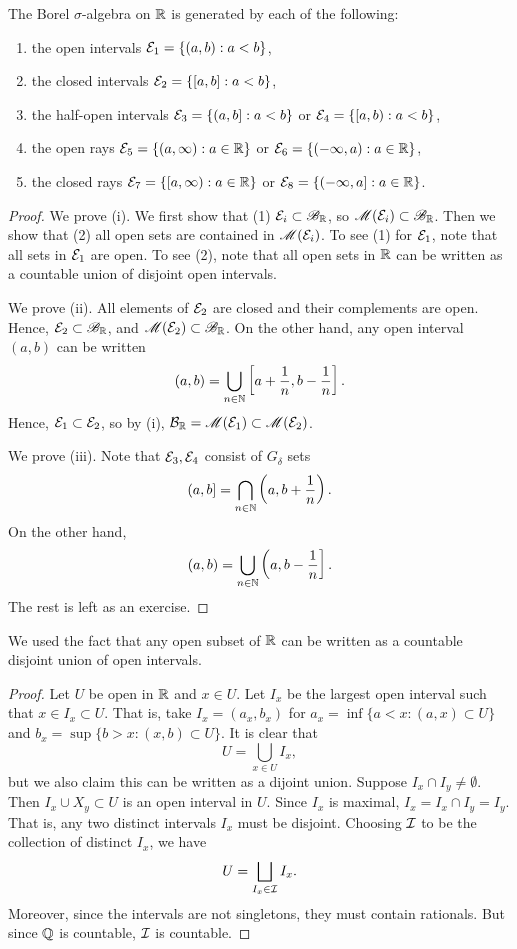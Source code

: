 \documentclass[12pt]{article} %
\begin{document}
\begin{proposition}
    The Borel $\sigma$-algebra on $\mathbb{R}$ is generated by each of the following:\begin{enumerate}
        \item the open intervals $\mathcal{E}_1 = \{(a, b) : a < b\}$,
        \item the closed intervals $\mathcal{E}_2 = \{[a, b] : a < b\}$,
        \item the half-open intervals $\mathcal{E}_3 = \{(a, b] : a < b\}$ or $\mathcal{E}_4 = \{[a, b) : a < b\}$,
        \item the open rays $\mathcal{E}_5 = \{(a, \infty) : a \in \mathbb{R} \}$ or $\mathcal{E}_6 = \{(-\infty, a) : a \in \mathbb{R} \}$,
        \item the closed rays $\mathcal{E}_7 = \{[a, \infty) : a \in \mathbb{R}\}$ or $\mathcal{E}_8 = \{(-\infty, a] : a \in \mathbb{R}\}$.
    \end{enumerate}
\end{proposition}

\begin{proof}
    We prove (i). We first show that (1) $\mathcal{E}_i \subset \mathscr{B}_{\mathbb{R}}$, so $\mathscr{M}(\mathcal{E}_i) \subset \mathscr{B}_{\mathbb{R}}$. Then we show that (2) all open sets are contained in $\mathscr{M}(\mathcal{E}_i)$. To see (1) for $\mathcal{E}_1$, note that all sets in $\mathcal{E}_1$ are open. To see (2), note that all open sets in $\mathbb{R}$ can be written as a countable union of disjoint open intervals.

    We prove (ii). All elements of $\mathcal{E}_2$ are closed and their complements are open. Hence, $\mathcal{E}_2 \subset \mathscr{B}_{\mathbb{R}}$, and $\mathscr{M}(\mathcal{E}_2) \subset \mathscr{B}_{\mathbb{R}}$. On the other hand, any open interval $(a, b)$ can be written \[(a, b) = \bigcup_{n \in \mathbb{N}} \left[a + \frac{1}{n}, b - \frac{1}{n}\right].\] Hence, $\mathcal{E}_1 \subset \mathcal{E}_2$, so by (i), $\mathcal{B}_{\mathbb{R}} = \mathscr{M}(\mathcal{E}_1) \subset \mathscr{M}(\mathcal{E}_2)$.

    We prove (iii). Note that $\mathcal{E}_3, \mathcal{E}_4$ consist of $G_\delta$ sets \[(a, b] = \bigcap_{n \in \mathbb{N}}\left(a, b + \frac{1}{n}\right).\] On the other hand, \[(a, b) = \bigcup_{n \in \mathbb{N}} \left(a, b - \frac{1}{n}\right].\]
    The rest is left as an exercise.
\end{proof}

\begin{remark}
    We used the fact that any open subset of $\mathbb{R}$ can be written as a countable disjoint union of open intervals.
\end{remark}

\begin{proof}
    Let $U$ be open in $\mathbb{R}$ and $x \in U$. Let $I_x$ be the largest open interval such that $x \in I_x \subset U$. That is, take $I_x = (a_x, b_x)$ for $a_x = \inf\{a < x : (a, x) \subset U\}$ and $b_x = \sup \{ b > x : (x, b) \subset U\}$. It is clear that \[U = \bigcup_{x \in U} I_x,\] but we also claim this can be written as a dijoint union. Suppose $I_x \cap I_y \neq \emptyset$. Then $I_x \cup X_y \subset U$ is an open interval in $U$. Since $I_x$ is maximal, $I_x = I_x \cap I_y = I_y$. That is, any two distinct intervals $I_x$ must be disjoint. Choosing $\mathcal{I}$ to be the collection of distinct $I_x$, we have \[U = \bigsqcup_{I_x \in \mathcal{I}} I_x.\] Moreover, since the intervals are not singletons, they must contain rationals. But since $\mathbb{Q}$ is countable, $\mathcal{I}$ is countable.
\end{proof}
\end{document}
